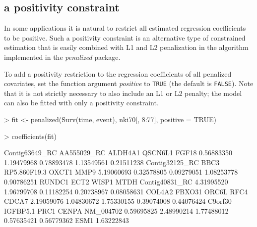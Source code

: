 \documentclass[a4paper]{article}
\newcommand{\Robject}[1]{{\texttt{#1}}}
\newcommand{\Rpackage}[1]{{\textit{#1}}}
\newcommand{\Rfunarg}[1]{{\textit{#1}}}
\begin{document}
\subsection{a positivity constraint}

In some applications it is natural to restrict all estimated regression coefficients to be positive. Such a positivity constraint is an alternative type of constrained estimation that is easily combined with L1 and L2 penalization in the algorithm implemented in the \Rpackage{penalized} package.

To add a positivity restriction to the regression coefficients of all penalized covariates, set the function argument \Rfunarg{positive} to \Robject{TRUE} (the default is \Robject{FALSE}). Note that it is not strictly necessary to also include an L1 or L2 penalty; the model can also be fitted with only a positivity constraint.

\begin{Schunk}
\begin{Sinput}
> fit <- penalized(Surv(time, event), nki70[, 8:77], positive = TRUE)
\end{Sinput}
\end{Schunk}
\begin{Schunk}
\begin{Sinput}
> coefficients(fit)
\end{Sinput}
\begin{Soutput}
Contig63649_RC    AA555029_RC        ALDH4A1        QSCN6L1          FGF18 
    0.56883350     1.19479968     0.78893478     1.13549561     0.21511238 
Contig32125_RC           BBC3   RP5.860F19.3          OXCT1           MMP9 
    5.19060693     0.32578805     0.09279051     1.08253778     0.90786251 
        RUNDC1           ECT2          WISP1           MTDH Contig40831_RC 
    4.31995520     1.96799708     0.11182254     0.20738967     0.08058631 
        COL4A2         FBXO31          ORC6L           RFC4          CDCA7 
    2.19059076     1.04830672     1.75330155     0.39074008     0.44076424 
       C9orf30       IGFBP5.1           PRC1          CENPA      NM_004702 
    0.59695825     2.48990214     1.77488012     0.57635421     0.56779362 
          ESM1 
    1.63222843 
\end{Soutput}
\end{Schunk}
\end{document}
